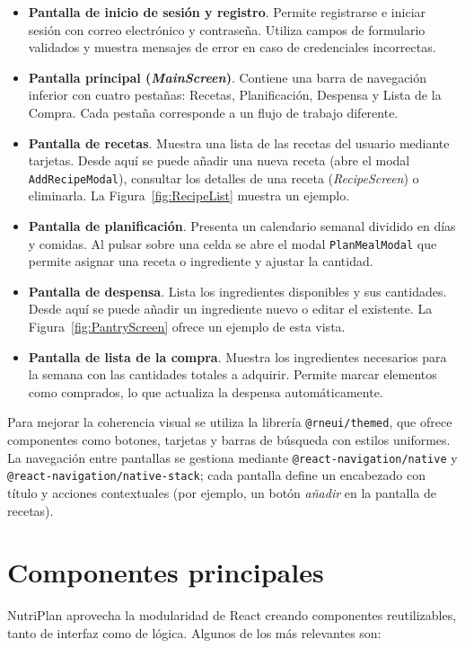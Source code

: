 \documentclass[twoside, openright, 11pt]{report}
\begin{document}
\begin{itemize}
  \item \textbf{Pantalla de inicio de sesión y registro}. Permite registrarse e iniciar sesión con correo electrónico y contraseña. Utiliza campos de formulario validados y muestra mensajes de error en caso de credenciales incorrectas.
  \item \textbf{Pantalla principal (\emph{MainScreen})}. Contiene una barra de navegación inferior con cuatro pestañas: Recetas, Planificación, Despensa y Lista de la Compra. Cada pestaña corresponde a un flujo de trabajo diferente.
  \item \textbf{Pantalla de recetas}. Muestra una lista de las recetas del usuario mediante tarjetas. Desde aquí se puede añadir una nueva receta (abre el modal \texttt{AddRecipeModal}), consultar los detalles de una receta (\emph{RecipeScreen}) o eliminarla. La Figura~\ref{fig:RecipeList} muestra un ejemplo.
  \item \textbf{Pantalla de planificación}. Presenta un calendario semanal dividido en días y comidas. Al pulsar sobre una celda se abre el modal \texttt{PlanMealModal} que permite asignar una receta o ingrediente y ajustar la cantidad.
  \item \textbf{Pantalla de despensa}. Lista los ingredientes disponibles y sus cantidades. Desde aquí se puede añadir un ingrediente nuevo o editar el existente. La Figura~\ref{fig:PantryScreen} ofrece un ejemplo de esta vista.
  \item \textbf{Pantalla de lista de la compra}. Muestra los ingredientes necesarios para la semana con las cantidades totales a adquirir. Permite marcar elementos como comprados, lo que actualiza la despensa automáticamente.
\end{itemize}

Para mejorar la coherencia visual se utiliza la librería \texttt{@rneui/themed}, que ofrece componentes como botones, tarjetas y barras de búsqueda con estilos uniformes. La navegación entre pantallas se gestiona mediante \texttt{@react-navigation/native} y \texttt{@react-navigation/native-stack}; cada pantalla define un encabezado con título y acciones contextuales (por ejemplo, un botón \emph{añadir} en la pantalla de recetas).

\section{Componentes principales}
NutriPlan aprovecha la modularidad de React creando componentes reutilizables, tanto de interfaz como de lógica. Algunos de los más relevantes son:
\end{document}
